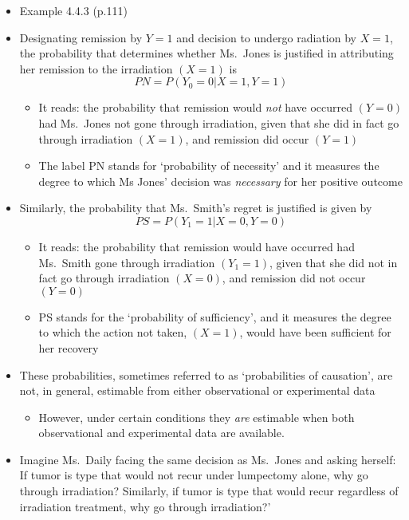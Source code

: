 \documentclass[]{article}
\providecommand{\tightlist}{%
  \setlength{\itemsep}{0pt}\setlength{\parskip}{0pt}}
\begin{document}
\begin{itemize}
\item
  Example 4.4.3 (p.111)
\item
  Designating remission by \(Y = 1\) and decision to undergo radiation
  by \(X = 1\), the probability that determines whether Ms.~Jones is
  justified in attributing her remission to the irradiation \((X = 1)\)
  is \[PN = P(Y_0 = 0 | X = 1, Y = 1)\]

  \begin{itemize}
  \tightlist
  \item
    It reads: the probability that remission would \emph{not} have
    occurred \((Y = 0)\) had Ms.~Jones not gone through irradiation,
    given that she did in fact go through irradiation \((X = 1)\), and
    remission did occur \((Y = 1)\)
  \item
    The label PN stands for `probability of necessity' and it measures
    the degree to which Ms Jones' decision was \emph{necessary} for her
    positive outcome
  \end{itemize}
\item
  Similarly, the probability that Ms.~Smith's regret is justified is
  given by \[PS = P(Y_1 = 1 | X = 0, Y = 0)\]

  \begin{itemize}
  \tightlist
  \item
    It reads: the probability that remission would have occurred had
    Ms.~Smith gone through irradiation \((Y_1 = 1)\), given that she did
    not in fact go through irradiation \((X = 0)\), and remission did
    not occur \((Y = 0)\)
  \item
    PS stands for the `probability of sufficiency', and it measures the
    degree to which the action not taken, \((X = 1)\), would have been
    sufficient for her recovery
  \end{itemize}
\item
  These probabilities, sometimes referred to as `probabilities of
  causation', are not, in general, estimable from either observational
  or experimental data

  \begin{itemize}
  \tightlist
  \item
    However, under certain conditions they \emph{are} estimable when
    both observational and experimental data are available.
  \end{itemize}
\item
  Imagine Ms.~Daily facing the same decision as Ms.~Jones and asking
  herself: If tumor is type that would not recur under lumpectomy alone,
  why go through irradiation? Similarly, if tumor is type that would
  recur regardless of irradiation treatment, why go through
  irradiation?'


\end{itemize}
\end{document}
